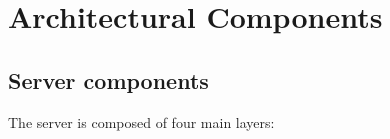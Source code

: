\documentclass[12pt]{report}
\begin{document}

\chapter{Architectural Components}

\section{Server components}

The server is composed of four main layers:
\end{document}
